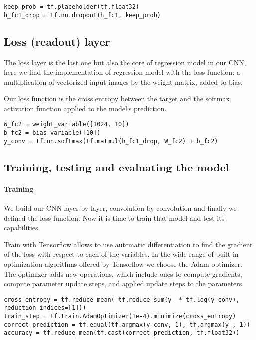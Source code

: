 \begin{lstlisting}
keep_prob = tf.placeholder(tf.float32)
h_fc1_drop = tf.nn.dropout(h_fc1, keep_prob)
\end{lstlisting}

\subsection{Loss (readout) layer}

The loss layer is the last one but also the core of regression model in our \acs{CNN}, here we find the implementation of regression model with the loss function: a multiplication of vectorized input images by the weight matrix, added to bias.

Our loss function is the cross entropy between the target and the softmax activation function applied to the model's prediction.

\begin{lstlisting}
W_fc2 = weight_variable([1024, 10])
b_fc2 = bias_variable([10])
y_conv = tf.nn.softmax(tf.matmul(h_fc1_drop, W_fc2) + b_fc2)
\end{lstlisting}

\subsection{Training, testing and evaluating the model}

\paragraph{Training}

We build our \acs{CNN} layer by layer, convolution by convolution and finally we defined the loss function. Now it is time to train that model and test its capabilities.

Train with Tensorflow allows to use automatic differentiation to find the gradient of the loss with respect to each of the variables. In the wide range of built-in optimization algorithms offered by Tensorflow we choose the Adam optimizer. The optimizer adds new operations, which include ones to compute gradients, compute parameter update steps, and applied update steps to the parameters.

\begin{lstlisting}
cross_entropy = tf.reduce_mean(-tf.reduce_sum(y_ * tf.log(y_conv), reduction_indices=[1]))
train_step = tf.train.AdamOptimizer(1e-4).minimize(cross_entropy)
correct_prediction = tf.equal(tf.argmax(y_conv, 1), tf.argmax(y_, 1))
accuracy = tf.reduce_mean(tf.cast(correct_prediction, tf.float32))
\end{lstlisting}

